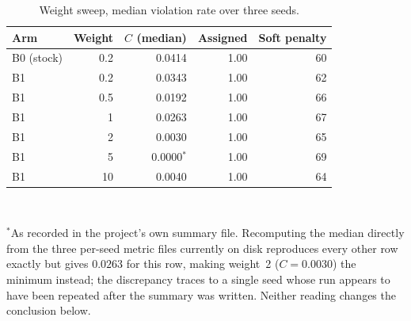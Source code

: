 \documentclass[journal]{IEEEtran}
\begin{document}
\begin{table}[t]
\centering
\caption{Weight sweep, median violation rate over three seeds.}
\label{tab:sweep}
\footnotesize
\begin{tabular}{@{}lrrrr@{}}
\toprule
Arm & Weight & $C$ (median) & Assigned & Soft penalty \\
\midrule
B0 (stock) & 0.2 & 0.0414 & 1.00 & 60 \\
B1 & 0.2 & 0.0343 & 1.00 & 62 \\
B1 & 0.5 & 0.0192 & 1.00 & 66 \\
B1 & 1 & 0.0263 & 1.00 & 67 \\
B1 & 2 & 0.0030 & 1.00 & 65 \\
B1 & 5 & 0.0000$^{*}$ & 1.00 & 69 \\
B1 & 10 & 0.0040 & 1.00 & 64 \\
\bottomrule
\end{tabular}
\\[2pt]
\raggedright\footnotesize $^{*}$As recorded in the project's own summary file. Recomputing the median directly from the three per-seed metric files currently on disk reproduces every other row exactly but gives $0.0263$ for this row, making weight~2 ($C=0.0030$) the minimum instead; the discrepancy traces to a single seed whose run appears to have been repeated after the summary was written. Neither reading changes the conclusion below.
\end{table}
\end{document}
